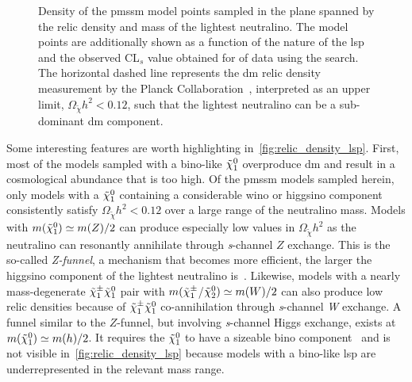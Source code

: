 \begin{figure}
\begin{subfigure}[b]{0.542\linewidth}
		\caption{\label{fig:relic_density_lsp_cls}}
	\end{subfigure}\hfill
	\caption{Density of the \gls{pmssm} model points sampled in the plane spanned by the relic density and mass of the lightest neutralino. The model points are additionally shown as a function of  the nature of the \gls{lsp} and  the observed CL$_s$ value obtained for \onethirtynineifb of data using the \onelepton search. The horizontal dashed line represents the \gls{dm} relic density measurement by the Planck Collaboration~\cite{Planck}, interpreted as an upper limit, $\Omega_{\tilde{\chi}} h^2 < 0.12$, such that the lightest neutralino can be a sub-dominant \gls{dm} component.}
	\label{fig:relic_density}
\end{figure}


Some interesting features are worth highlighting in~\cref{fig:relic_density_lsp}. First, most of the models sampled with a bino-like $\tilde{\chi}_1^0$ overproduce \gls{dm} and result in a cosmological abundance that is too high.
Of the \gls{pmssm} models sampled herein, only models with a $\tilde{\chi}_1^0$ containing a considerable wino or higgsino component consistently satisfy $\Omega_{\tilde{\chi}} h^2 < 0.12$ over a large range of the neutralino mass.
Models with $m(\tilde{\chi}_1^0) \simeq m(Z)/2$ can produce especially low values in $\Omega_{\tilde{\chi}} h^2$ as the neutralino can resonantly annihilate through \textit{s}-channel $Z$ exchange. This is the so-called \textit{Z-funnel}, a mechanism that becomes more efficient, the larger the higgsino component of the lightest neutralino is~\cite{Cabrera:2016wwr}.
Likewise, models with a nearly mass-degenerate $\tilde{\chi}_1^\pm\tilde{\chi}_1^0$ pair with $ m(\tilde{\chi}_1^\pm$/$\tilde{\chi}_2^0) \simeq m(W)/2$ can also produce low relic densities because of $\tilde{\chi}_1^\pm\tilde{\chi}_1^0$ co-annihilation through \textit{s}-channel \textit{W} exchange.
A funnel similar to the $Z$-funnel, but involving \textit{s}-channel Higgs exchange, exists at $m(\tilde{\chi}_1^0) \simeq m(h)/2$. It requires the $\tilde{\chi}_1^0$ to have a sizeable bino component~\cite{Cabrera:2016wwr} and is not visible in~\cref{fig:relic_density_lsp} because models with a bino-like \gls{lsp} are underrepresented in the relevant mass range.

